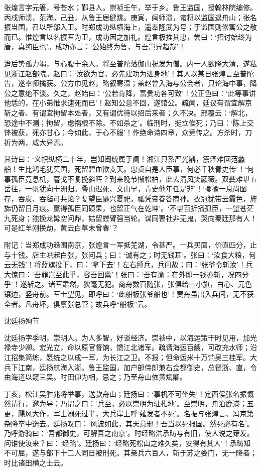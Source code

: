 \documentclass[]{article}
\begin{document}
张煌言字元箸，号苍水；鄞县人。崇祯壬午，举于乡。鲁王监国，授翰林院编修。丙戌师溃，范海。己丑，从鲁王居健跳。庚寅，闽师溃，诸将以监国退舟山；张名振当国，召以所部入卫。时郑成功纵横海上，遥奉隆武为号；于监国则修寓公之敬而已。惟煌言以名振军为卫，成功因之加礼。煌言极推其忠，尝曰：`招讨始终为唐，真纯臣也'。成功亦言：`公始终为鲁，与吾岂异趋哉'！

迨后势孤力竭，与心腹十余人，将至普陀落伽山祝发为僧。内一人欲降大清，遂私见浙江赵部院。赵曰：`汝欲为官，必先建功为进身地'！其人以某日张煌言至普陀告，遂率师擒获。公方巾见赵，略叙寒温；盖赵曾入海与公会者，只论海中事，降公之意绝不谈。久之，赵始曰：`公若肯降，富贵功各可致'！公正色曰：`此等事讲他恁的，在小弟惟求速死而已'！赵知公意不回，遂馆公。疏闻，廷议有谓宜解京斩之者、有谓宜拘留本处者，又有谓优待以招后来者；久不决。部覆云：`解北，恐途中不测；拘留，虑祸根不除。不如杀之'。临刑时，挺立俟死；乃曰：`陈上交锋被获，死亦甘心；今如此，于心不服'！作绝命诗四章，众竞传之。方杀时，刀折为两，咸大异焉。

其诗曰：`义帜纵横二十年，岂知闽统属于阗！湘江只系严光鼎，震泽难回范蠡船！生比鸿毛犹买国，死留碧血欲支天。忠贞自是人臣事，何必千秋青史传'！`何事孤臣竟息机，暮戈不复挽斜晖？到来晚节惭松柏，此去清风笑蕨薇。双鬓难堪五岳往，一帆犹向十洲归。叠山迟死、文山早，青史他年任是非'！`揶揄一息尚图存，吞炭、吞毡可共论？复望臣靡兴夏祀，祗凭帝眷答商孙。衣冠犹带云霞色，旌旆仍留日月痕。赢得孤臣同硕果，也留正气在乾坤'。`不堪百折播孤臣，一望苍茫九死身；独挽龙髯空问鼎，姑留螳臂强当轮。谋同曹社非无鬼，哭向秦廷那有人！可是红羊刚换劫，黄云白草未曾春'？

附记：当郑成功趋围南京，张煌言一军抵芜湖，令甚严。一兵买面，价直四分，止与十钱。店主哄起白张，张问兵；曰：`诚有之；时无钱耳'。张曰：`汝食大粮，何云无钱'！将蓝旗投下，曰：`拿下去'！左右缚兵，兵问故；曰：`张爷令斩汝'！兵大惊曰：`吾罪岂至此乎，容吾回禀'！张曰：`吾有谕：在外即一钱亦斩，况四分乎'！遂斩之。诸军肃然，狄毫无犯。商舟数百随张，张俱给一小旗，白心、元色镶边，竖舟前。军士望见，即呼曰：`此船板张爷船也'！贾舟虽出入兵间，无不获全者。凡舟坏，俱禀张总管；故兵呼``船板''云。

沈廷扬殉节

沈廷扬字季明，崇明人。为人多智，好谈经济。崇祯中，以海运策干时见用，加光禄寺少卿。宏光立，命以原官督饷，馈江北诸军。疏请海运百艘，可改充水师；沿江招集简练，愿统之以成一军，为长江之卫。不报；但命运米十万饷吴三桂军。大兵下江南，廷扬航海入浙。鲁王监国，加户部侍郎兼右佥都御史，总督浙、直，令由海道以窥三吴。时田仰为相，忌之；乃至舟山依黄斌卿。

丁亥，松江吴胜兆将举事，送款舟山；廷扬曰：`事机不可坐失'！定西侯张名振慨然请行，邀为导；乃谓之曰：`兵至，必以崇明为驻札地'。至崇明，舟泊鹿港；五更，飓风大作，军士溺死过半，大兵岸上呼`薙发者不死'。名振与张煌言、冯京第杂降卒中逸去。廷扬叹曰：`风波如此，其天意邪！吾当以死报国。然死必有名'。乃呼游骑曰：`吾都御史，可解吾之南京'。时经略洪承畴与有旧，使人说之薙发。问谁使汝来？曰：`经略'。廷扬曰：`经略死松山之难久矣，安得有其人'！承畴知不可屈，遂与部下十二人同日被刑死。其亲兵六百人，斩于苏之娄门，无一降者；时比诸田横之士云。
\end{document}
